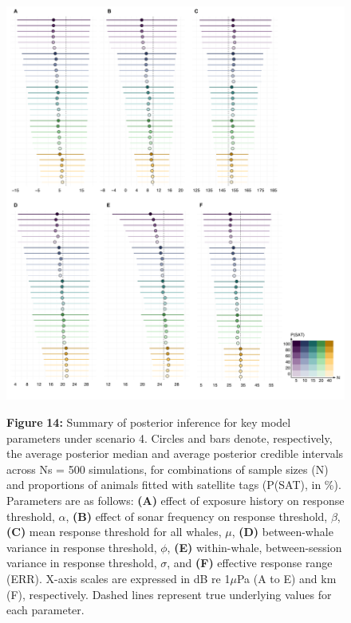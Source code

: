 \documentclass[
]{article}
\begin{document}
\begin{figure}

{\centering \includegraphics[width=0.9\linewidth]{fig/fig_forestplot_S4} 

}

\textbf{Figure }{\textbf{14:} \hypertarget{fig14}{}Summary of posterior inference for key model parameters under scenario 4. Circles and bars denote, respectively, the average posterior median and average posterior credible intervals across Ns = 500 simulations, for combinations of sample sizes (N) and proportions of animals fitted with satellite tags (P(SAT), in \%). Parameters are as follows: \textbf{(A)} effect of exposure history on response threshold, \(\alpha\), \textbf{(B)} effect of sonar frequency on response threshold, \(\beta\), \textbf{(C)} mean response threshold for all whales, \(\mu\), \textbf{(D)} between-whale variance in response threshold, \(\phi\), \textbf{(E)} within-whale, between-session variance in response threshold, \(\sigma\), and \textbf{(F)} effective response range (ERR). X-axis scales are expressed in dB re 1\(\mu\)Pa (A to E) and km (F), respectively. Dashed lines represent true underlying values for each parameter.}\label{fig:unnamed-chunk-13}
\end{figure}
\end{document}
